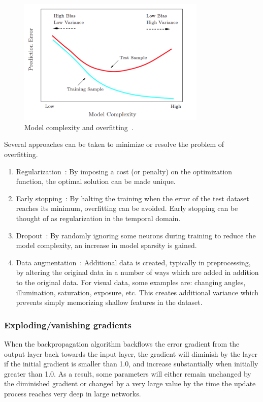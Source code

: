 \documentclass[oneside, english, bibtex]{kththesis}
\begin{document}
\begin{figure}[H]
  \begin{center}
    \includegraphics[width=0.8\textwidth]{figures/overfitting.png}
  \end{center}
  \caption{Model complexity and overfitting~\cite{Wang_2019}. }
  \label{fig:overfitting}
\end{figure}

Several approaches can be taken to minimize or resolve the problem of overfitting.
\begin{enumerate}
\item Regularization~\cite{10.1038/317314a0}: By imposing a cost (or penalty) on the optimization function, the optimal solution can be made unique.
\item Early stopping~\cite{Prechelt2012}: By halting the training when the error of the test dataset reaches its minimum, overfitting can be avoided. Early stopping can be thought of as regularization in the temporal domain.
\item Dropout~\cite{JMLR:v15:srivastava14a}: By randomly ignoring some neurons during training to reduce the model complexity, an increase in model sparsity is gained.
\item Data augmentation~\cite{10.2307/2289457}: Additional data is created, typically in preprocessing, by altering the original data in a number of ways which are added in addition to the original data. For visual data, some examples are: changing angles, illumination, saturation, exposure, etc. This creates additional variance which prevents simply memorizing shallow features in the dataset.
\end{enumerate}

\subsubsection{Exploding/vanishing gradients}
When the backpropagation algorithm backflows the error gradient from the output layer back towards the input layer, the gradient will diminish by the layer if the initial gradient is smaller than 1.0, and increase substantially when initially greater than 1.0. As a result, some parameters will either remain unchanged by the diminished gradient or changed by a very large value by the time the update process reaches very deep in large networks.
\end{document}
